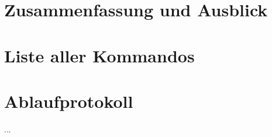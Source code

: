 \documentclass[a4paper]{book}
\begin{document}

\chapter{Zusammenfassung und Ausblick}



\cleardoublepage
{}


\cleardoublepage
\listoftables              %
\cleardoublepage
\listoffigures             %



\cleardoublepage
{}
\begin{appendix}           %

\chapter{Liste aller Kommandos}


\chapter{Ablaufprotokoll}
...

\end{appendix}


\end{document}
